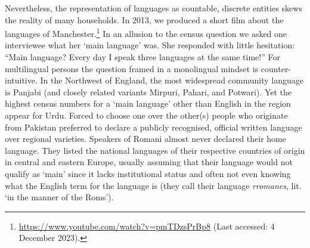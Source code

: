 \documentclass[output=paper]{langscibook}
\begin{document}
Nevertheless, the representation of languages as countable, discrete entities skews the reality of many households. In 2013, we produced a short film about the languages of Manchester.\footnote{\url{https://www.youtube.com/watch?v=pmTDzsPrBp8} (Last accessed: 4 December 2023).}  In an allusion to the census question we asked one interviewee what her ‘main language’ was. She responded with little hesitation: “Main language? Every day I speak three languages at the same time!” For multilingual persons the question framed in a monolingual mindset is counter-intuitive. In the Northwest of England, the most widespread community language is Panjabi (and closely related variants Mirpuri, Pahari, and Potwari). Yet the highest census numbers for a ‘main language’ other than English in the region appear for Urdu. Forced to choose one over the other(s) people who originate from Pakistan preferred to declare a publicly recognised, official written language over regional varieties. Speakers of Romani almost never declared their home language. They listed the national languages of their respective countries of origin in central and eastern Europe, usually assuming that their language would not qualify as ‘main’ since it lacks institutional status and often not even knowing what the English term for the language is (they call their language \textit{rromanes}, lit. ‘in the manner of the Roms’).
\end{document}
